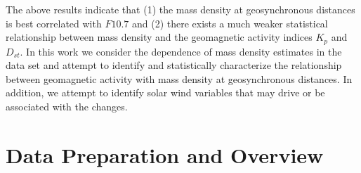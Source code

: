 \documentclass[draft,linenumbers]{agujournal}
\begin{document}
The above results indicate that (1) the mass density at geosynchronous distances is best correlated with $F10.7$ and (2) there exists a much weaker statistical relationship between mass density and the geomagnetic activity indices $K_p$ and $D_{st}$.  In this work we consider the dependence of mass density estimates in the \citet{Takahashi2010} data set and attempt to identify and statistically characterize the relationship between geomagnetic activity with mass density at geosynchronous distances.  In addition, we attempt to identify solar wind variables that may drive or be associated with the changes. 




\section{Data Preparation and Overview}
\end{document}
